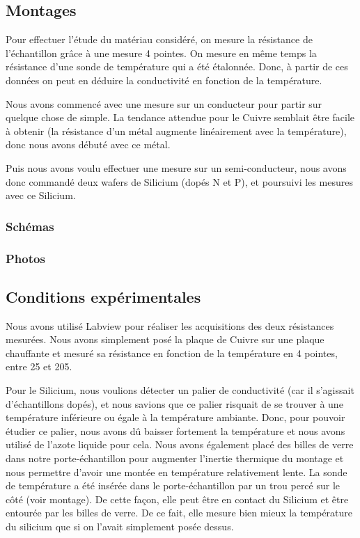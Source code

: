 \subsection{Montages}
Pour effectuer l'étude du matériau considéré, on mesure la résistance de l'échantillon grâce à une mesure 4 pointes.
On mesure en même temps la résistance d'une sonde de température qui a été étalonnée.
Donc, à partir de ces données on peut en déduire la conductivité en fonction de la température.


Nous avons commencé avec une mesure sur un conducteur pour partir sur quelque chose de simple.
La tendance attendue pour le Cuivre semblait être facile à obtenir (la résistance d'un métal augmente linéairement avec la température), donc nous avons débuté avec ce métal.


Puis nous avons voulu effectuer une mesure sur un semi-conducteur, nous avons donc commandé deux wafers de Silicium (dopés N et P), et poursuivi les mesures avec ce Silicium.


\subsubsection{Schémas}

\subsubsection{Photos}


\subsection{Conditions expérimentales}
Nous avons utilisé Labview pour réaliser les acquisitions des deux résistances mesurées.
Nous avons simplement posé la plaque de Cuivre sur une plaque chauffante et mesuré sa résistance en fonction de la température en 4 pointes, entre 25\celsius{} et 205\celsius{}.


Pour le Silicium, nous voulions détecter un palier de conductivité (car il s'agissait d'échantillons dopés), et nous savions que ce palier risquait de se trouver à une température inférieure ou égale à la température ambiante.
Donc, pour pouvoir étudier ce palier, nous avons dû baisser fortement la température et nous avons utilisé de l'azote liquide pour cela.
Nous avons également placé des billes de verre dans notre porte-échantillon pour augmenter l'inertie thermique du montage et nous permettre d'avoir une montée en température relativement lente.
La sonde de température a été insérée dans le porte-échantillon par un trou percé sur le côté (voir montage). De cette façon, elle peut être en contact du Silicium et être entourée par les billes de verre.
De ce fait, elle mesure bien mieux la température du silicium que si on l'avait simplement posée dessus.


